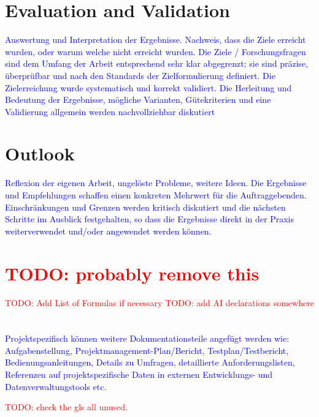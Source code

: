 \documentclass[12pt, a4paper, oneside]{book}   	%
\renewcommand{\todo}[1]{\textcolor{red}{TODO: #1}}
\newcommand{\baaCriteria}[1]{\textcolor{blue}{#1}}
\begin{document}
	\chapter{Evaluation and Validation}
		\baaCriteria{Auswertung und Interpretation der Ergebnisse. Nachweis, dass die Ziele erreicht wurden, oder warum	welche nicht erreicht wurden.}
		\baaCriteria{Die Ziele / Forschungsfragen sind dem Umfang der Arbeit entsprechend sehr klar abgegrenzt; sie sind präzise, überprüfbar und nach den Standards der Zielformulierung definiert. Die Zielerreichung wurde systematisch und korrekt validiert.}
		\baaCriteria{Die Herleitung und Bedeutung der Ergebnisse, mögliche Varianten, Gütekriterien und eine Validierung allgemein werden nachvollziehbar diskutiert}
	
	\chapter{Outlook}
		\baaCriteria{Reflexion der eigenen Arbeit, ungelöste Probleme, weitere Ideen.}
		\baaCriteria{Die Ergebnisse und Empfehlungen schaffen einen konkreten Mehrwert für die Auftraggebenden. Einschränkungen und Grenzen werden kritisch diskutiert und die nächsten Schritte im Ausblick festgehalten, so dass die Ergebnisse direkt in der Praxis weiterverwendet und/oder angewendet werden können.}
		
		\newpage




	\chapter{\glossaryname \todo{probably remove this}}
	\todo{Add List of Formulas if necessary}
	\todo{add \gls{AI} declarations somewhere}
	
	
	\chapter{\bibname}
		\printbibliography[heading=none]
		
		
		
		\appendix
			\baaCriteria{Projektspezifisch können weitere Dokumentationsteile angefügt werden wie: Aufgabenstellung, Projektmanagement-Plan/Bericht, Testplan/Testbericht, Bedienungsanleitungen, Details zu Umfragen, detaillierte Anforderungslisten, Referenzen auf projektspezifische Daten in externen Entwicklungs- und Datenverwaltungstools etc.}
			
		\glsaddallunused                                %
		\todo{check the gls all unused.}
	
\end{document}
